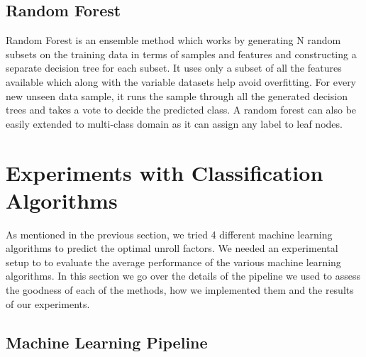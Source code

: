 \documentclass[]{sig-alternate}
\begin{document}
\subsection{Random Forest}
\label{subsec:RandomForest}

Random Forest is an ensemble method which works by generating N random subsets on the training data in terms of samples and features and constructing a separate decision tree for each subset. It uses only a subset of all the features available which along with the variable datasets help avoid overfitting. For every new unseen data sample, it runs the sample through all the generated decision trees and takes a vote to decide the predicted class. A random forest can also be easily extended to multi-class domain as it can assign any label to leaf nodes. 

\section{Experiments with Classification Algorithms}
\label{sec:ExperimentsClassification}

As mentioned in the previous section, we tried 4 different machine learning algorithms to predict the optimal unroll factors. We needed an experimental setup to to evaluate the average performance of the various machine learning algorithms. In this section we go over the details of the pipeline we used to assess the goodness of each of the methods, how we implemented them and the results of our experiments. 

\subsection{Machine Learning Pipeline}
\label{subsec:MachineLearningPipeline}
\end{document}
